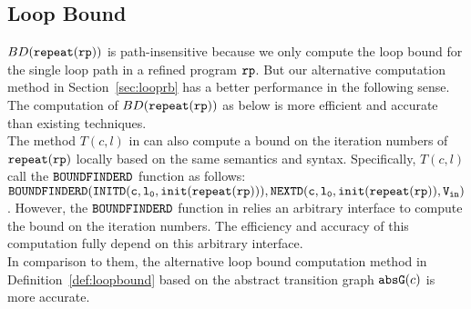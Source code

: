 \subsection{Loop Bound}
$BD(\mathtt{repeat}({\mathtt{rp}}))$  is path-insensitive because we only compute the loop bound
for the single loop path in a refined program $\mathtt{rp}$.
But our alternative computation method in Section~\ref{sec:looprb} has a better performance in the following sense.
The computation of $BD(\mathtt{repeat}({\mathtt{rp}}))$ 
as below is more efficient and accurate than existing techniques.
\\
The method $T(c, l)$ in \cite{GulwaniJK09} can also compute a
bound on the iteration numbers of $\mathtt{repeat}({\mathtt{rp}})$ locally based on
the same semantics and syntax.
Specifically, $T(c, l)$ call the $\mathtt{BOUNDFINDERD}$ function as follows:
\\
$\mathtt{BOUNDFINDERD(INITD(c, l_0, \mathtt{init}(\mathtt{repeat}({\mathtt{rp}}))),
NEXTD(c, l_0, \mathtt{init}(\mathtt{repeat}({\mathtt{rp}})), V_{\mathtt{in}} )}$.
However, the $\mathtt{BOUNDFINDERD}$ function in \cite{GulwaniJK09} relies an arbitrary interface to
compute the bound on the iteration numbers.
The efficiency and accuracy of this computation fully depend on this arbitrary interface.
\\
In comparison to them, the alternative loop bound computation method in 
Definition~\ref{def:loopbound} based on the abstract transition graph $\mathtt{abs}{\mathtt{G}}(c)$ is more accurate.

